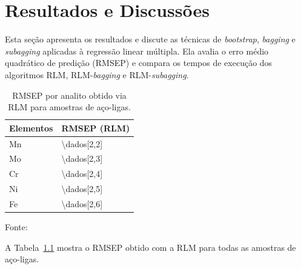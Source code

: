 \chapter{Resultados e Discussões}
\label{sec:result}
Esta seção apresenta os resultados e discute as técnicas de \textit{bootstrap}, \textit{bagging} e \textit{subagging} aplicadas à regressão linear múltipla. Ela avalia o erro médio quadrático de predição (RMSEP) e compara os tempos de execução dos algoritmos RLM, RLM-\textit{bagging} e RLM-\textit{subagging}.

\def\namostras{Nº de amostras}


\begin{table}[!htbp]
\centering
\small
\begin{threeparttable}
\caption{RMSEP por analito obtido via RLM para amostras de aço-ligas.}
\label{tab:rmseprlm}
\begin{tabular}{p{3cm} p{4cm}} %
\toprule
\textbf{Elementos} & \textbf{RMSEP (RLM)} \\ 
\midrule
Mn & \num{\dados[2,2]} \\ 
Mo & \num{\dados[2,3]} \\ 
Cr & \num{\dados[2,4]} \\ 
Ni & \num{\dados[2,5]} \\ 
Fe & \num{\dados[2,6]} \\ 
\bottomrule
\end{tabular}
\begin{tablenotes}[flushleft] %
    \footnotesize
    \item \footnotesize Fonte:~\oautor
\end{tablenotes}
\end{threeparttable}
\end{table}

A Tabela~\ref{tab:rmseprlm} mostra o RMSEP obtido com a RLM para todas as amostras de aço-ligas.

